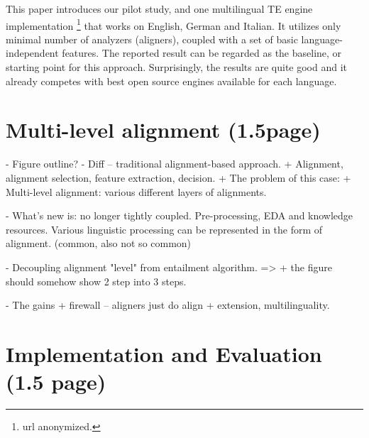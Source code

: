 \documentclass[11pt,letterpaper]{article}
\begin{document}
This paper introduces our pilot study, and one multilingual TE engine
implementation \footnote{url anonymized.} that works on English,
German and Italian. It utilizes only minimal number of analyzers
(aligners), coupled with a set of basic language-independent
features. The reported result can be regarded as the baseline, or
starting point for this approach. Surprisingly, the results are quite
good and it already competes with best open source engines available
for each language. 


\section{Multi-level alignment (1.5page)}



- Figure outline? 
- Diff -- traditional alignment-based approach. 
  + Alignment, alignment selection, feature extraction, decision. 
  + The problem of this case: 
  + Multi-level alignment: various different layers of alignments. 

- What's new is: no longer tightly coupled. Pre-processing, EDA and
  knowledge resources. Various linguistic processing can be
  represented in the form of alignment. (common, also not so common) 

- Decoupling alignment "level" from entailment algorithm. =>
  + the figure should somehow show 2 step into 3 steps. 

- The gains 
  + firewall -- aligners just do align 
  + extension,  multilinguality. 


\section{Implementation and Evaluation (1.5 page)}
\end{document}
